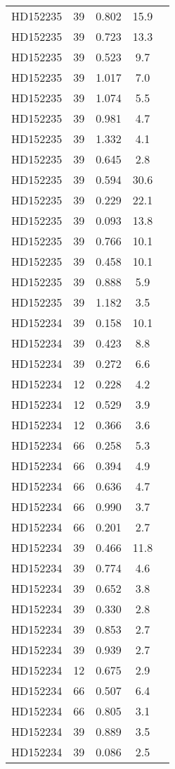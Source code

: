 \begin{table*}
\begin{tabular}{l c c c c}
HD152235 & 39 & 0.802 & 15.9\\ 
HD152235 & 39 & 0.723 & 13.3\\ 
HD152235 & 39 & 0.523 & 9.7\\ 
HD152235 & 39 & 1.017 & 7.0\\ 
HD152235 & 39 & 1.074 & 5.5\\ 
HD152235 & 39 & 0.981 & 4.7\\ 
HD152235 & 39 & 1.332 & 4.1\\ 
HD152235 & 39 & 0.645 & 2.8\\ 
HD152235 & 39 & 0.594 & 30.6\\ 
HD152235 & 39 & 0.229 & 22.1\\ 
HD152235 & 39 & 0.093 & 13.8\\ 
HD152235 & 39 & 0.766 & 10.1\\ 
HD152235 & 39 & 0.458 & 10.1\\ 
HD152235 & 39 & 0.888 & 5.9\\ 
HD152235 & 39 & 1.182 & 3.5\\ 
\hline
HD152234 & 39 & 0.158 & 10.1\\ 
HD152234 & 39 & 0.423 & 8.8\\ 
HD152234 & 39 & 0.272 & 6.6\\ 
HD152234 & 12 & 0.228 & 4.2\\ 
HD152234 & 12 & 0.529 & 3.9\\ 
HD152234 & 12 & 0.366 & 3.6\\ 
HD152234 & 66 & 0.258 & 5.3\\ 
HD152234 & 66 & 0.394 & 4.9\\ 
HD152234 & 66 & 0.636 & 4.7\\ 
HD152234 & 66 & 0.990 & 3.7\\ 
HD152234 & 66 & 0.201 & 2.7\\ 
HD152234 & 39 & 0.466 & 11.8\\ 
HD152234 & 39 & 0.774 & 4.6\\ 
HD152234 & 39 & 0.652 & 3.8\\ 
HD152234 & 39 & 0.330 & 2.8\\ 
HD152234 & 39 & 0.853 & 2.7\\ 
HD152234 & 39 & 0.939 & 2.7\\ 
HD152234 & 12 & 0.675 & 2.9\\ 
HD152234 & 66 & 0.507 & 6.4\\ 
HD152234 & 66 & 0.805 & 3.1\\ 
HD152234 & 39 & 0.889 & 3.5\\ 
HD152234 & 39 & 0.086 & 2.5\\ 

\end{tabular}
\end{table*}
